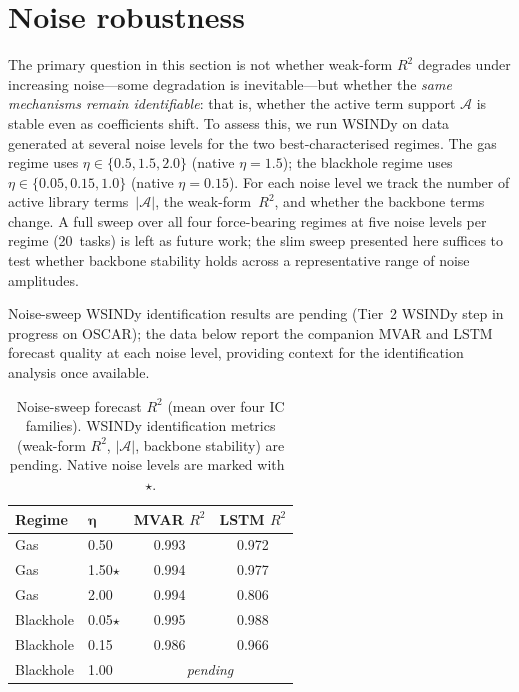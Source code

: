\section{Noise robustness}
\label{sec:wsindy_noise}

The primary question in this section is not whether weak-form $R^2$ degrades
under increasing noise---some degradation is inevitable---but whether the
\emph{same mechanisms remain identifiable}: that is, whether the active term
support $\mathcal{A}$ is stable even as coefficients shift.
To assess this, we run WSINDy on data generated at several noise
levels for the two best-characterised regimes.  The gas regime uses
$\eta \in \{0.5, 1.5, 2.0\}$ (native $\eta{=}1.5$); the blackhole
regime uses $\eta \in \{0.05, 0.15, 1.0\}$ (native $\eta{=}0.15$).
For each noise level we track the number of active library
terms~$|\mathcal{A}|$, the weak-form~$R^2$, and whether the backbone
terms change.  A full sweep over all four force-bearing regimes at five
noise levels per regime (20~tasks) is left as future work; the slim
sweep presented here suffices to test whether backbone stability holds
across a representative range of noise amplitudes.

Noise-sweep WSINDy identification results are pending (Tier~2 WSINDy
step in progress on OSCAR); the data below report the companion MVAR and
LSTM forecast quality at each noise level, providing context for the
identification analysis once available.

\begin{table}[ht]
\centering
\caption{Noise-sweep forecast $R^2$ (mean over four IC families).
WSINDy identification metrics (weak-form $R^2$, $|\mathcal{A}|$, backbone
stability) are pending.  Native noise levels are marked with~$\star$.}
\label{tab:noise_sweep_forecast}
\renewcommand{\arraystretch}{0.95}
\small
\begin{tabular}{llcc}
\toprule
\textbf{Regime} & $\boldsymbol{\eta}$ & \textbf{MVAR} $R^2$ & \textbf{LSTM} $R^2$ \\
\midrule
Gas      & 0.50          & 0.993 & 0.972 \\
Gas      & 1.50$\star$   & 0.994 & 0.977 \\
Gas      & 2.00          & 0.994 & 0.806 \\
\midrule
Blackhole & 0.05$\star$  & 0.995 & 0.988 \\
Blackhole & 0.15         & 0.986 & 0.966 \\
Blackhole & 1.00         & \multicolumn{2}{c}{\textit{pending}} \\
\bottomrule
\end{tabular}
\end{table}

